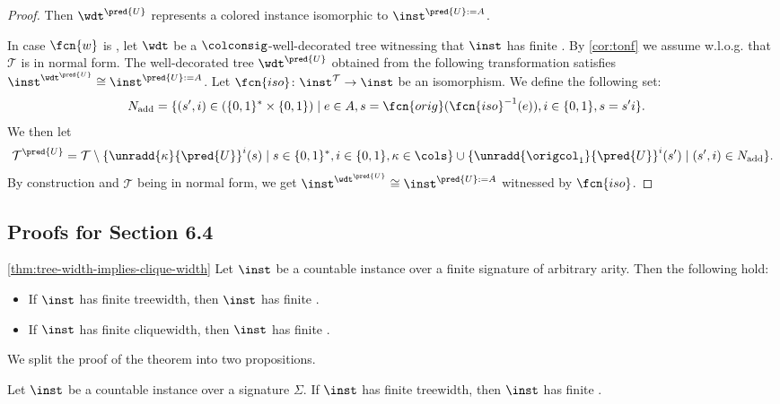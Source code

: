 \begin{proof}
Then $\wdt^{\pred{U}}$ represents a colored instance isomorphic to $\inst^{\pred{U}:=A}$.

\bigskip
In case $\fcn{w}$ is \hypercliquewidth{}, let $\wdt$ be a $\colconsig$-well-decorated tree witnessing that $\inst$ has finite \hypercliquewidth{}. By \cref{cor:tonf} we assume w.l.o.g. that $\mathcal{T}$ is in normal form. The well-decorated tree $\wdt^{\pred{U}}$ obtained from the following transformation satisfies $\inst^{\wdt^{\pred{U}}} \cong \inst^{\pred{U}:=A}$. Let $\fcn{iso}\colon \inst^{\mathcal{T}}\to \inst$ be an isomorphism. We define the following set:
\begin{align*}
	N_{\mathrm{add}} &=  \{ (s', i )\in (\{ 0,1 \}^*\times \{ 0,1 \}) \mid e\in A, s = \fcn{orig}(\fcn{iso}^{-1}(e)), i\in\{ 0,1 \}, s = s'i  \}.
\end{align*}
We then let
$$
\mathcal{T}^{\pred{U}} = \mathcal{T}  
\setminus \{\unradd{\kappa}{\pred{U}}^{i}(s) \mid s \in \{ 0,1 \}^*, i\in\{ 0,1 \}, \kappa \in \cols\}
\cup \{ \unradd{\origcol_{1}}{\pred{U}}^{i}(s') \mid (s',i)\in N_{\mathrm{add}} \} .
$$%
By construction and $\mathcal{T}$ being in normal form, we get $\inst^{\wdt^{\pred{U}}} \cong \inst^{\pred{U}:=A}$ witnessed by $\fcn{iso}$.
\end{proof}


\subsection{Proofs for Section 6.4}

\begin{customthm}{\ref{thm:tree-width-implies-clique-width}}
	Let $\inst$ be a countable instance over a finite signature of arbitrary arity. Then the following hold:
	\begin{itemize}
		\item If $\inst$ has finite treewidth, then $\inst$ has finite \ercwidth{}.
		\item If $\inst$ has finite cliquewidth, then $\inst$ has finite \ercwidth{}.
	\end{itemize}
\end{customthm}

We split the proof of the theorem into two propositions.

\begin{proposition}\label{prop:tw-implies-pw}
	Let $\inst$ be a countable instance over a signature $\Sigma$. If $\inst$ has finite treewidth, then $\inst$ has finite \ercwidth{}.
\end{proposition}

